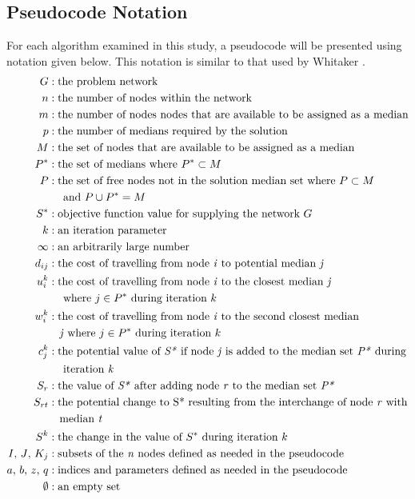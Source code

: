 \documentclass[11pt]{article}
\newcommand{\np}{\newpage}
\begin{document}
	\subsection{Pseudocode Notation} \label{pseudocode.notation}
	For each algorithm examined in this study, a pseudocode will be presented using notation given below.  This notation is similar to that used by Whitaker \cite{WHIT83}.
	\begin{align*}
	G &: \text{the problem network}\\
	n &: \text{the number of nodes within the network}\\
	m &: \text{the number of nodes nodes that are available to be assigned as a median}\\
	p &: \text{the number of medians required by the solution}\\
	M &: \text{the set of nodes that are available to be assigned as a median}\\
	P^{*} &: \text{the set of medians where } P^{*} \subset M\\
	P &: \text{the set of free nodes not in the solution median set where } P \subset M\\
			& \quad \text{ and } P \cup P^{*} = M\\
	S^{*} &: \text{objective function value for supplying the network } G\\
	k &: \text{an iteration parameter}\\
	\infty &: \text{an arbitrarily large number}\\
	d_{ij} &: \text{the cost of travelling from node \emph{i} to potential median \emph{j}}\\
	u_{i}^{k} &: \text{the cost of travelling from node \emph{i} to the closest median \emph{j}}\\
			& \quad \text{ where } j \in P^{*} \text{ during iteration } k\\
	w_{i}^{k} &: \text{the cost of travelling from node \emph{i} to the second closest median}\\
			& \quad \text{\emph{j} where } j \in P^{*} \text{ during iteration } k\\
	c_{j}^{k} &: \text{the potential value of \emph{S*} if node \emph{j} is added to the median set \emph{P*} during}\\
			& \quad \text{ iteration \emph{k}}\\
	S_{r} &: \text{the value of \emph{S*} after adding node \emph{r} to the median set \emph{P*}}\\
	S_{rt} &: \text{the potential change to S* resulting from the interchange of node \emph{r} with}\\
		& \quad \text{median \emph{t}}\\
	S^k &: \text{the change in the value of $S^*$ during iteration $k$}\\
	I \text{, } J \text{, } K_{j} &: \text{subsets of the \emph{n} nodes defined as needed in the pseudocode}\\
	a \text{, } b \text{, } z \text{, } q &: \text{indices and parameters defined as needed in the pseudocode}\\
	\emptyset &: \text{an empty set}	
	\end{align*}
	\np
	
\end{document}
